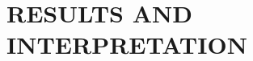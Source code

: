 \documentclass[aspectratio=169, 10pt]{beamer}
\begin{document}
\section{RESULTS AND INTERPRETATION}





\begin{frame}
	\begin{center}
		\colorbox{white}{}
	\end{center}
\end{frame}



\end{document}
